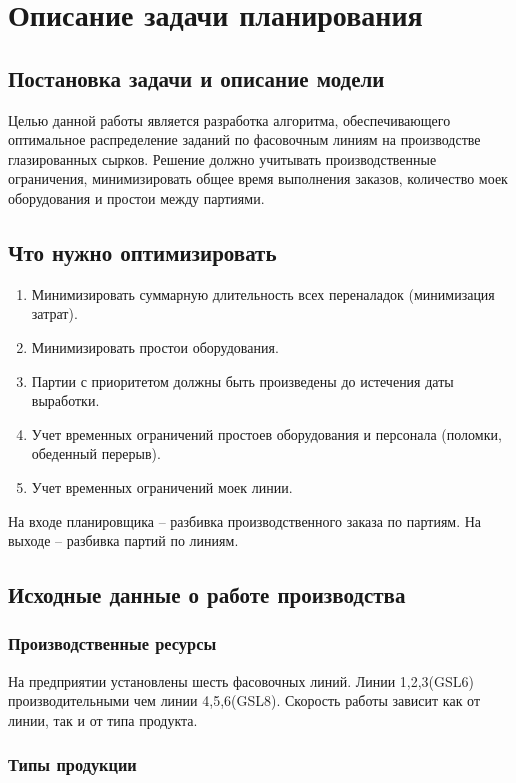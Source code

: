 \chapter{ Описание задачи планирования}
\label{ch:chapter2}

\section{Постановка задачи и описание модели}
Целью данной работы является разработка алгоритма, обеспечивающего оптимальное распределение заданий по фасовочным линиям на производстве глазированных сырков. Решение должно учитывать производственные ограничения, минимизировать общее время выполнения заказов, количество моек оборудования и простои между партиями.

\section{Что нужно оптимизировать}

\begin{enumerate}
	\item Минимизировать суммарную длительность всех переналадок (минимизация затрат).
	\item Минимизировать простои оборудования.
	\item Партии с приоритетом должны быть произведены до истечения даты выработки.
	\item Учет временных ограничений простоев оборудования и персонала (поломки, обеденный перерыв).
	\item Учет временных ограничений моек линии.
\end{enumerate}

На входе планировщика – разбивка производственного заказа по партиям. На выходе – разбивка партий по линиям.

\section{Исходные данные о работе производства}

\subsection{Производственные ресурсы}
На предприятии установлены шесть фасовочных линий.  Линии 1,2,3(GSL6) производительными чем линии 4,5,6(GSL8). Скорость работы зависит как от линии, так и от типа продукта.

\subsection{Типы продукции}

